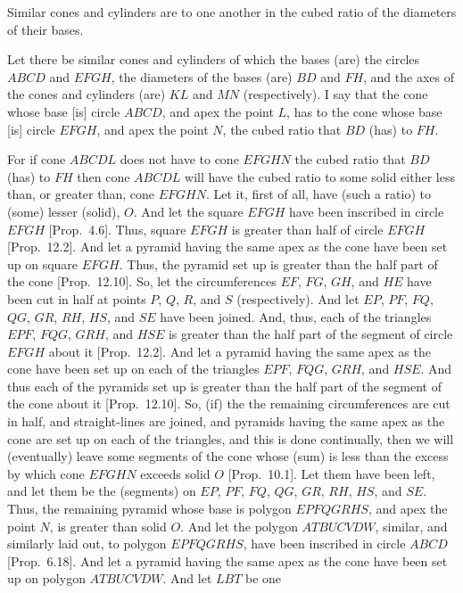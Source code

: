 Similar cones and cylinders are to one another in the cubed ratio of
the diameters of their bases.

Let there be similar cones and cylinders of which the bases (are) the circles $ABCD$ and $EFGH$, the diameters of the bases (are) $BD$ and $FH$,
and the axes of the cones and cylinders (are)  $KL$ and $MN$ (respectively). I say that the cone whose base [is] circle $ABCD$, and apex the
point $L$,  has to the cone whose base [is] circle $EFGH$, and apex the point $N$,  the cubed ratio  that $BD$ (has) to $FH$.

\epsfysize=1.7in
\centerline{}

For if cone $ABCDL$ does not have to cone $EFGHN$ the cubed ratio that $BD$ (has) to $FH$ then cone $ABCDL$ will  have the
cubed ratio to some solid either less than, or greater than, cone $EFGHN$. Let it, first of all, have (such a  ratio) to
(some) lesser (solid), $O$. And let the square $EFGH$ have been inscribed in circle $EFGH$ [Prop.~4.6]. 
Thus, square $EFGH$ is greater than half of circle $EFGH$ [Prop.~12.2]. And let a pyramid having the
same apex as the cone have been set up on square $EFGH$. Thus, the pyramid set up is greater than the half part of the cone [Prop.~12.10]. So, let the circumferences $EF$, $FG$, $GH$, and $HE$ have been cut in half at points $P$, $Q$, $R$, and $S$ (respectively). 
And let $EP$, $PF$, $FQ$, $QG$, $GR$, $RH$, $HS$, and $SE$ have been
joined. And, thus, each of the triangles $EPF$, $FQG$, $GRH$, and $HSE$
is greater than the half part of the segment of circle $EFGH$ about it  [Prop.~12.2]. And let a pyramid having the same apex as
the cone have been set up on each of the triangles $EPF$, $FQG$, $GRH$, and $HSE$. And thus each of the pyramids set up is greater than
the half part of the segment of the cone about it [Prop.~12.10]. So, (if) the the remaining circumferences are cut in half, and 
straight-lines are joined, and pyramids having the same apex as the cone are set up on each of 
the triangles, and this is done continually, then we will (eventually) leave some segments of the 
cone whose (sum) is less than the excess by which cone $EFGHN$ exceeds solid $O$ [Prop.~10.1].
Let them have been left, and let them be the (segments) on $EP$, $PF$, $FQ$, $QG$, $GR$, $RH$, $HS$, and $SE$. Thus, the remaining
pyramid whose base is polygon $EPFQGRHS$, and apex the point $N$, is greater than solid $O$.  And let the polygon
$ATBUCVDW$, similar, and similarly laid out, to polygon $EPFQGRHS$, have been inscribed in circle $ABCD$ [Prop.~6.18].
And let a pyramid having the same apex as the cone have been set up on polygon $ATBUCVDW$. And let $LBT$ be one
